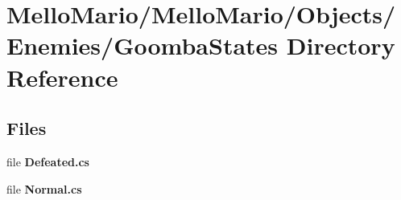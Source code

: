 \section{Mello\+Mario/\+Mello\+Mario/\+Objects/\+Enemies/\+Goomba\+States Directory Reference}
\label{dir_dc1b575f6f555b69ae269551f432dd8e}
\subsection*{Files}
\begin{DoxyCompactItemize}
\item 
file \textbf{ Defeated.\+cs}
\item 
file \textbf{ Normal.\+cs}
\end{DoxyCompactItemize}
